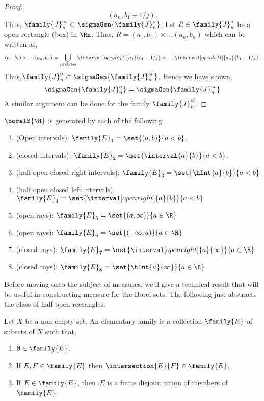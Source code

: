 \begin{proof}
\begin{equation*}
	(a_n,b_1+1/j).
    \end{equation*}	    
    Thus, $\family{J}^{cr}_{n} \subset \sigmaGen{\family{J}^{o}_{n}}$. Let $R \in 
    \family{J}^{o}_{n}$ be a open rectangle (box) in $\Rn$. 
    Thus, $R = (a_1,b_1) \times \dots (a_n,b_n)$ which can be written as,
    \begin{equation*}
	(a_1,b_1)\times\dots(a_n,b_n) = \bigcup\limits_{j\in\Zplus}
	\interval[open left]{a_1}{b_1-1/j}\times\dots\interval[open left]{a_n}{b_1-1/j}.
    \end{equation*}
    Thus,$\family{J}^{o}_{n} \subset \sigmaGen{\family{J}^{cr}_{n}}$. Hence we have shown,
    \begin{equation*}
	\sigmaGen{\family{J}^{o}_{n}} = \sigmaGen{\family{J}^{cr}_{n}}
    \end{equation*}
    A similar argument can be done for the family $\family{J}^{cl}_{n}$.
\end{proof}
\begin{Corollary}\label{thm:gen_borel_R}
    $\borelS{\R}$ is generated by each of the following:
    \begin{enumerate}
	\item
	    (Open intervals): $\family{E}_1 = \set{(a,b)}{a < b}$.
	\item
	    (closed intervals): $\family{E}_2 = \set{\interval{a}{b}}{a < b}$.
	\item
	    (half open closed right intervals): $\family{E}_3 = \set{\hInt{a}{b}}{a < b}$
	\item
	    (half open closed left intervals): $\family{E}_4 = \set{\interval[open right]{a}{b}}{a < b}$
	\item
	    (open rays): $\family{E}_5 = \set{(a,\infty)}{a \in \R}$
	\item
	    (open rays): $\family{E}_6 = \set{(-\infty,a)}{a \in \R}$
	\item
	    (closed rays): $\family{E}_7 = \set{\interval[open right]{a}{\infty}}{a \in \R}$
	\item
	    (closed rays): $\family{E}_8 = \set{\hInt{a}{\infty}}{a \in \R}$
    \end{enumerate}
\end{Corollary}
Before moving onto the subject of measures, we'll give a technical result that will be useful in
constructing measure for the Borel sets. The following just abstracts the class of half open
rectangles.
\begin{Definition}[name=Elementary family]
    Let $X$ be a non-empty set. An elementary family is a collection $\family{E}$ of subsets of $X$
    such that,
    \begin{enumerate}
	\item
	    $\emptyset \in \family{E}$.
	\item
	    If $E,F \in \family{E}$ then $\intersection{E}{F} \in \family{E}$.
	\item
	    If $E \in \family{E}$, then $\comp{E}$ is a finite disjoint union of members of
	    $\family{E}$.
    \end{enumerate}
\end{Definition}

